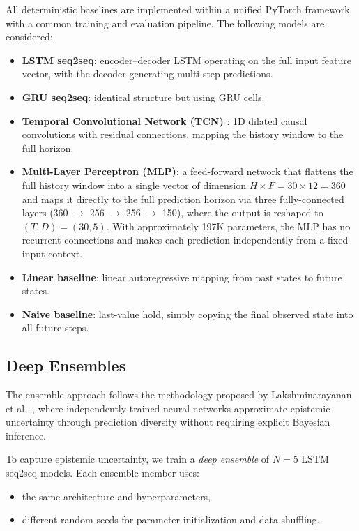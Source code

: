\documentclass[a4paper,fleqn]{cas-sc}
\begin{document}
All deterministic baselines are implemented within a unified PyTorch framework with a common training and evaluation pipeline. The following models are considered:
\begin{itemize}
    \item \textbf{LSTM seq2seq}: encoder--decoder LSTM operating on the full input feature vector, with the decoder generating multi-step predictions.
    \item \textbf{GRU seq2seq}: identical structure but using GRU cells.
    \item \textbf{Temporal Convolutional Network (TCN)} \cite{bai2018tcn}: 1D dilated causal convolutions with residual connections, mapping the history window to the full horizon.
    \item \textbf{Multi-Layer Perceptron (MLP)}: a feed-forward network that flattens 
the full history window into a single vector of dimension $H \times F = 30 \times 12 = 360$ 
and maps it directly to the full prediction horizon via three fully-connected layers 
(360 $\to$ 256 $\to$ 256 $\to$ 150), where the output is reshaped to $(T, D) = (30, 5)$. 
With approximately 197K parameters, the MLP has no recurrent connections and makes 
each prediction independently from a fixed input context.
    \item \textbf{Linear baseline}: linear autoregressive mapping from past states to future states.
    \item \textbf{Naive baseline}: last-value hold, simply copying the final observed state into all future steps.
\end{itemize}

\subsection{Deep Ensembles}

The ensemble approach follows the methodology proposed by Lakshminarayanan et al.~\cite{lakshminarayanan2017}, where independently trained neural networks approximate epistemic uncertainty through prediction diversity without requiring explicit Bayesian inference.


To capture epistemic uncertainty, we train a \emph{deep ensemble} of \(N=5\) LSTM seq2seq models. Each ensemble member uses:
\begin{itemize}
    \item the same architecture and hyperparameters,
    \item different random seeds for parameter initialization and data shuffling.
\end{itemize}
\end{document}
